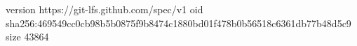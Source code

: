 version https://git-lfs.github.com/spec/v1
oid sha256:469549cc0cb98b5b0875f9b8474c1880bd01f478b0b56518c6361db77b48d5c9
size 43864
